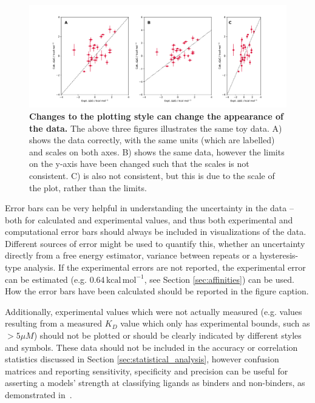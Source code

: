 \documentclass[9pt,bestpractices]{livecoms}
\begin{document}
\begin{figure}
    \includegraphics[width=0.95\linewidth]{figures/reporting/plotting-basics.pdf}
    \caption{\textbf{Changes to the plotting style can change the appearance of the data.} The above three figures illustrates the same toy data. A) shows the data correctly, with the same units (which are labelled) and scales on both axes. B) shows the same data, however the limits on the y-axis have been changed such that the scales is not consistent. C) is also not consistent, but this is due to the scale of the plot, rather than the limits.}
    \label{fig:plotting-basics}
\end{figure}

Error bars can be very helpful in understanding the uncertainty in the data -- both for calculated and experimental values, and thus both experimental and computational error bars should always be included in visualizations of the data. Different sources of error might be used to quantify this, whether an uncertainty directly from a free energy estimator, variance between repeats or a hysteresis-type analysis. If the experimental errors are not reported, the experimental error can be estimated (e.g. $0.64\,\mathrm{kcal\,mol^{-1}}$, see Section \ref{sec:affinities}) can be used. How the error bars have been calculated should be reported in the figure caption.


Additionally, experimental values which were not actually measured (e.g. values resulting from a measured $K_D$ value which only has experimental bounds, such as $> 5 \mu M$) should not be plotted or should be clearly indicated by different styles and symbols. These data should not be included in the accuracy or correlation statistics discussed in Section \ref{sec:statistical_analysis}, however confusion matrices and reporting sensitivity, specificity and precision can be useful for asserting a models' strength at classifying ligands as binders and non-binders, as demonstrated in~\cite{hauserPredictingResistanceClinical2018}.
\end{document}
